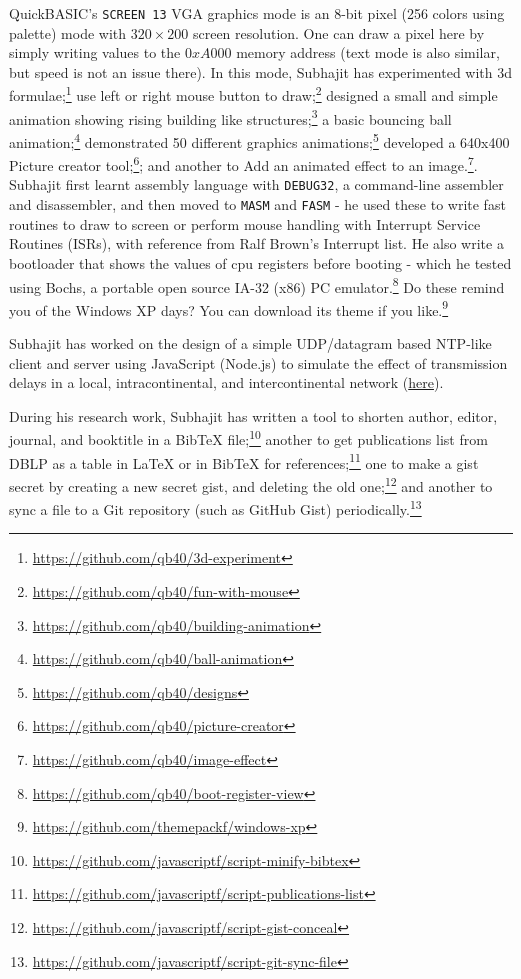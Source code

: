 QuickBASIC's \verb|SCREEN 13| VGA graphics mode is an 8-bit pixel (256 colors using palette) mode with $320\times200$ screen resolution. One can draw a pixel here by simply writing values to the $0xA000$ memory address (text mode is also similar, but speed is not an issue there). In this mode, Subhajit has experimented with 3d formulae;\footnote{\url{https://github.com/qb40/3d-experiment}} use left or right mouse button to draw;\footnote{\url{https://github.com/qb40/fun-with-mouse}} designed a small and simple animation showing rising building like structures;\footnote{\url{https://github.com/qb40/building-animation}} a basic bouncing ball animation;\footnote{\url{https://github.com/qb40/ball-animation}} demonstrated 50 different graphics animations;\footnote{\url{https://github.com/qb40/designs}} developed a 640x400 Picture creator tool;\footnote{\url{https://github.com/qb40/picture-creator}}; and another to Add an animated effect to an image.\footnote{\url{https://github.com/qb40/image-effect}}. Subhajit first learnt assembly language with \verb|DEBUG32|, a command-line assembler and disassembler, and then moved to \verb|MASM| and \verb|FASM| - he used these to write fast routines to draw to screen or perform mouse handling with Interrupt Service Routines (ISRs), with reference from Ralf Brown's Interrupt list. He also write a bootloader that shows the values of cpu registers before booting - which he tested using Bochs, a portable open source IA-32 (x86) PC emulator.\footnote{\url{https://github.com/qb40/boot-register-view}} Do these remind you of the Windows XP days? You can download its theme if you like.\footnote{\url{https://github.com/themepackf/windows-xp}}


Subhajit has worked on the design of a simple UDP/datagram based NTP-like client and server using JavaScript (Node.js) to simulate the effect of transmission delays in a local, intracontinental, and intercontinental network (\href{https://github.com/javascriptf/nodejs-time-server}{here}).


During his research work, Subhajit has written a tool to shorten author, editor, journal, and booktitle in a BibTeX file;\footnote{\url{https://github.com/javascriptf/script-minify-bibtex}} another to get publications list from DBLP as a table in LaTeX or in BibTeX for references;\footnote{\url{https://github.com/javascriptf/script-publications-list}} one to make a gist secret by creating a new secret gist, and deleting the old one;\footnote{\url{https://github.com/javascriptf/script-gist-conceal}} and another to sync a file to a Git repository (such as GitHub Gist) periodically.\footnote{\url{https://github.com/javascriptf/script-git-sync-file}}


